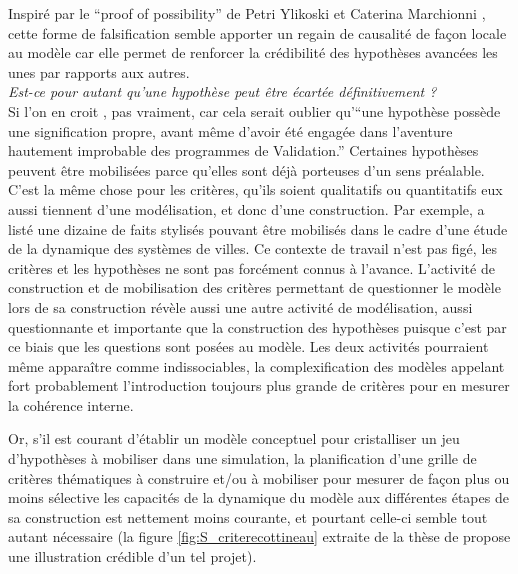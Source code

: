 Inspiré par le \foreignquote{english}{proof of possibility} de Petri Ylikoski et Caterina Marchionni \autocite{Marchionni2013}, cette forme de falsification  semble apporter un regain de causalité de façon locale au modèle car elle permet de renforcer la crédibilité des hypothèses avancées les unes par rapports aux autres.
\\
\textit{Est-ce pour autant qu'une hypothèse peut être écartée définitivement ?}
\\
Si l'on en croit \textcite[17]{Besse2000}, pas vraiment, car cela serait oublier qu'\enquote{une hypothèse possède une signification propre, avant même d’avoir été engagée dans l’aventure hautement improbable des programmes de Validation.} Certaines hypothèses peuvent être mobilisées parce qu'elles sont déjà porteuses d'un sens préalable. C'est la même chose pour les critères, qu'ils soient qualitatifs ou quantitatifs eux aussi tiennent d'une modélisation, et donc d'une construction. Par exemple, \textcite[80]{Schmitt2014} a listé une dizaine de faits stylisés pouvant être mobilisés dans le cadre d'une étude de la dynamique des systèmes de villes. Ce contexte de travail n'est pas figé, les critères et les hypothèses ne sont pas forcément connus à l'avance. L'activité de construction et de mobilisation des critères permettant de questionner le modèle lors de sa construction révèle aussi une autre activité de modélisation, aussi questionnante et importante que la construction des hypothèses puisque c'est par ce biais que les questions sont posées au modèle. Les deux activités pourraient même apparaître comme indissociables, la complexification des modèles appelant fort probablement l'introduction toujours plus grande de critères pour en mesurer la cohérence interne.

Or, s'il est courant d'établir un modèle conceptuel pour cristalliser un jeu d'hypothèses à mobiliser dans une simulation, la planification d'une grille de critères thématiques à construire et/ou à mobiliser pour mesurer de façon plus ou moins sélective les capacités de la dynamique du modèle aux différentes étapes de sa construction est nettement moins courante, et pourtant celle-ci semble tout autant nécessaire (la figure \ref{fig:S_criterecottineau} extraite de la thèse de \textcite{Cottineau2014b} propose une illustration crédible d'un tel projet).

